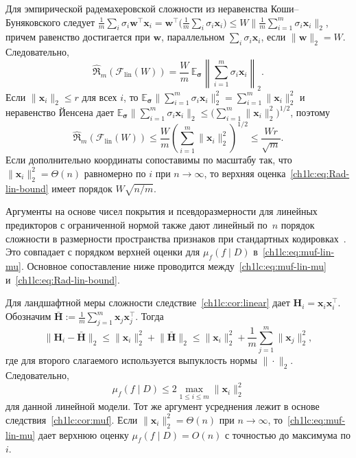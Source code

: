 Для эмпирической радемахеровской сложности из неравенства Коши--Буняковского следует
$\frac{1}{m}\sum_i \sigma_i \mathbf{w}^{\top}\mathbf{x}_i
= \mathbf{w}^{\top}\bigl(\frac{1}{m}\sum_i \sigma_i \mathbf{x}_i\bigr)
\le W \bigl\|\frac{1}{m}\sum_{i=1}^{m}\sigma_i \mathbf{x}_i\bigr\|_2$,
причем равенство достигается при $\mathbf{w}$, параллельном $\sum_i \sigma_i \mathbf{x}_i$, если $\|\mathbf{w}\|_2=W$.
Следовательно,
\begin{equation}\label{ch1lc:eq:Rad-lin-exact}
  \hat{\mathfrak{R}}_m(\mathcal{F}_{\mathrm{lin}}(W))
  = \frac{W}{m}\,
  \mathbb{E}_{\boldsymbol{\sigma}}\left\|
    \sum_{i=1}^{m}\sigma_i \mathbf{x}_i
  \right\|_2 .
\end{equation}
Если $\|\mathbf{x}_i\|_2\le r$ для всех $i$, то
$\mathbb{E}_{\boldsymbol{\sigma}}\|\sum_{i=1}^{m}\sigma_i \mathbf{x}_i\|_2^2=\sum_{i=1}^{m}\|\mathbf{x}_i\|_2^2$
и неравенство Йенсена дает
$\mathbb{E}_{\boldsymbol{\sigma}}\|\sum_{i=1}^{m}\sigma_i \mathbf{x}_i\|_2 \le \bigl(\sum_{i=1}^{m}\|\mathbf{x}_i\|_2^2\bigr)^{1/2}$,
поэтому
\begin{equation}\label{ch1lc:eq:Rad-lin-bound}
  \hat{\mathfrak{R}}_m(\mathcal{F}_{\mathrm{lin}}(W))
  \le \frac{W}{m}\left(\sum_{i=1}^{m}\|\mathbf{x}_i\|_2^2\right)^{1/2}
  \le \frac{W r}{\sqrt{m}} .
\end{equation}
Если дополнительно координаты сопоставимы по масштабу так, что $\|\mathbf{x}_i\|_2^2=\Theta(n)$ равномерно по $i$ при $n\to\infty$, то верхняя оценка~\eqref{ch1lc:eq:Rad-lin-bound} имеет порядок $W\sqrt{n/m}$.

Аргументы на основе чисел покрытия и псевдоразмерности для линейных предикторов с ограниченной нормой также дают линейный по~$n$ порядок сложности в размерности пространства признаков при стандартных кодировках~\cite{bartlett2002rademacher, vapnik1998}. Это совпадает с порядком верхней оценки для $\mu_f(f\mid D)$ в~\eqref{ch1lc:eq:muf-lin-mu}. Основное сопоставление ниже проводится между~\eqref{ch1lc:eq:muf-lin-mu} и~\eqref{ch1lc:eq:Rad-lin-bound}.

Для ландшафтной меры сложности следствие~\ref{ch1lc:cor:linear} дает $\mathbf{H}_i=\mathbf{x}_i\mathbf{x}_i^{\top}$. Обозначим $\bar{\mathbf{H}}:=\frac{1}{m}\sum_{j=1}^{m}\mathbf{x}_j\mathbf{x}_j^{\top}$.
Тогда
\begin{equation}\label{ch1lc:eq:muf-lin-bound}
  \bigl\|\mathbf{H}_i-\bar{\mathbf{H}}\bigr\|_2
  \le \|\mathbf{x}_i\|_2^2 + \bigl\|\bar{\mathbf{H}}\bigr\|_2
  \le \|\mathbf{x}_i\|_2^2 + \frac{1}{m}\sum_{j=1}^{m}\|\mathbf{x}_j\|_2^2 ,
\end{equation}
где для второго слагаемого используется выпуклость нормы $\|\cdot\|_2$.
Следовательно,
\begin{equation}\label{ch1lc:eq:muf-lin-mu}
  \mu_f(f\mid D)
  \le 2\max_{1\le i\le m}\|\mathbf{x}_i\|_2^2
\end{equation}
для данной линейной модели. Тот же аргумент усреднения лежит в основе следствия~\ref{ch1lc:cor:muf}.
Если $\|\mathbf{x}_i\|_2^2=\Theta(n)$ при $n\to\infty$, то~\eqref{ch1lc:eq:muf-lin-mu} дает верхнюю оценку $\mu_f(f\mid D)=O(n)$ с точностью до максимума по $i$.

